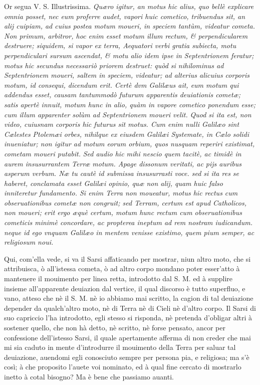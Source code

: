 \documentclass[11pt,twoside,openany]{book}
\begin{document}
\par\bigskip\noindent{}\enspace Or segua V. S. Illustrissima. \textit{Quæro igitur, an motus hic alius, quo bellè explicare omnia posset, nec eum proferre audet, vapori huic cometico, tribuendus sit, an alij cuipiam, ad cuius postea motum moueri, in speciem tantùm, videatur cometa. Non primum, arbitror, hoc enim esset motum illum rectum, \& perpendicularem destruere; siquidem, si vapor ex terra, Aequatori verbi gratia subiecta, motu perpendiculari sursum ascendat, \& motu alio idem ipse in Septentrionem feratur; motus hic secundus necessariò priorem destruet: quòd si nihilominus ad Septentrionem moueri, saltem in speciem, videatur; ad alterius alicuius corporis motum, id consequi, dicendum erit. Certè dvm Galilæus ait, eum motum qui addendus esset, causam tantummodò futurum apparentis deuiationis cometæ; satis apertè innuit, motum hunc in alio, quàm in vapore cometico ponendum esse; cum illum apparenter solùm ad Septentrionem moueri velit. }\textit{Quod si ita est, non video, cuiusnam corporis hic futurus sit motus. Cum enim nulli Galilæo sint Cælestes Ptolemæi orbes, nihilque ex eiusdem Galilæi Systemate, in Cælo solidi inueniatur; non igitur ad motum eorum orbium, quos nusquam reperiri existimat, cometam moueri putabit. }\textit{Sed audio hic mihi nescio quem tacitè, ac timidè in aurem insusurrantem Terræ }\textit{motum. Apage dissonum veritati, ac pijs auribus asperum verbum. Næ tu cautè id submissa insusurrasti voce. sed si ita res se haberet, conclamata esset Galilæi opinio, quæ non alij, quam huic falso inniteretur fundamento. Si enim Terra non moueatur, motus hic rectus cum obseruationibus cometæ non congruit; sed Terram, certum est apud Catholicos, non moueri; erit ergo æquè certum, motum hunc rectum cum obseruationibus cometicis minimè concordare, ac propterea ineptum ad rem nostram iudicandum. neque id ego vnquam Galilæo in mentem venisse existimo, quem pium semper, ac religiosum noui.}


Qui, com'ella vede, si va il Sarsi affaticando per mostrar, niun altro moto, che si attribuisca, ò all'istessa cometa, ò ad altro corpo mondano poter esser'atto à mantenere il mouimento per linea retta, introdotto dal S. M. ed à supplire insieme all'apparente deuiazion dal vertice, il qual discorso è tutto superfluo, e vano, atteso che nè il S. M. nè io abbiamo mai scritto, la cagion di tal deuiazione depender da qualch'altro moto, nè di Terra nè di Cieli nè d'altro corpo. Il Sarsi di suo capriccio l'ha introdotto, egli stesso si risponda, nè pretenda d'obligar altri à sostener quello, che non hà detto, nè scritto, nè forse pensato, ancor per confessione dell'istesso Sarsi, il quale apertamente afferma di non creder che mai mi sia caduto in mente d'introdurre il mouimento della Terra per saluar tal deuiazione, auendomi egli conosciuto sempre per persona pia, e religiosa; ma s'è così; à che proposito l'auete voi nominato, ed à qual fine cercato di mostrarlo inetto à cotal bisogno? Ma è bene che passiamo auanti.
\end{document}

